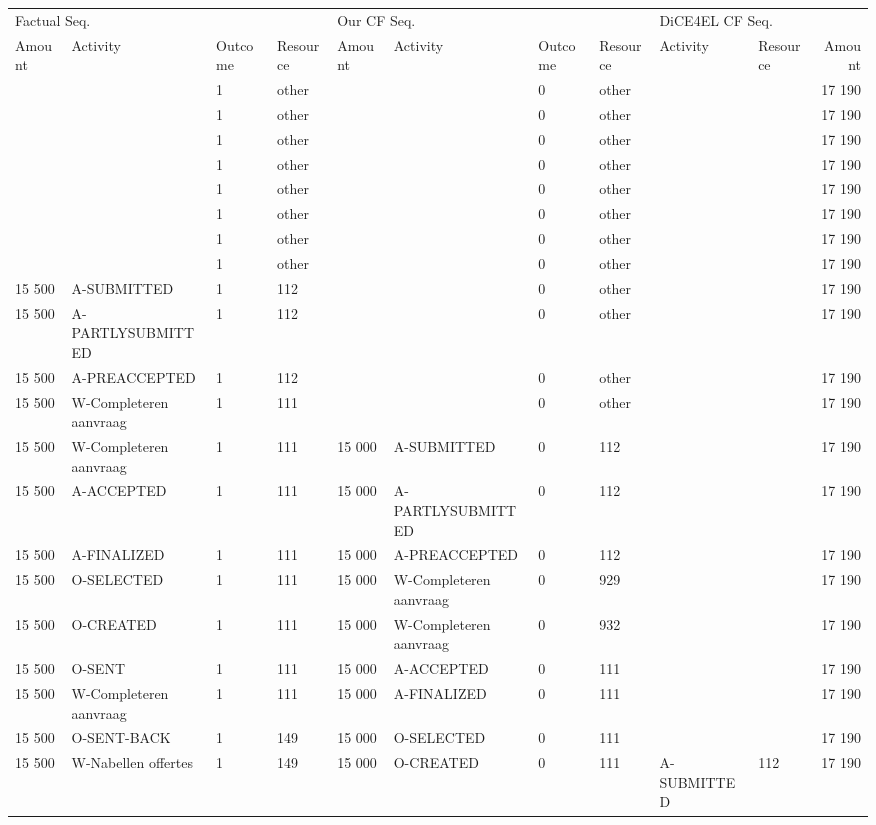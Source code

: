 \begin{tabular}{llllllllllr}
\toprule
\multicolumn{4}{l}{Factual Seq.} & \multicolumn{4}{l}{Our CF Seq.} & \multicolumn{3}{l}{DiCE4EL CF Seq.} \\
Amount & Activity & Outcome & Resource & Amount & Activity & Outcome & Resource & Activity & Resource & Amount \\
\midrule
 &  & 1 & other &  &  & 0 & other &  &  & 17 190 \\
 &  & 1 & other &  &  & 0 & other &  &  & 17 190 \\
 &  & 1 & other &  &  & 0 & other &  &  & 17 190 \\
 &  & 1 & other &  &  & 0 & other &  &  & 17 190 \\
 &  & 1 & other &  &  & 0 & other &  &  & 17 190 \\
 &  & 1 & other &  &  & 0 & other &  &  & 17 190 \\
 &  & 1 & other &  &  & 0 & other &  &  & 17 190 \\
 &  & 1 & other &  &  & 0 & other &  &  & 17 190 \\
15 500 & A-SUBMITTED & 1 & 112 &  &  & 0 & other &  &  & 17 190 \\
15 500 & A-PARTLYSUBMITTED & 1 & 112 &  &  & 0 & other &  &  & 17 190 \\
15 500 & A-PREACCEPTED & 1 & 112 &  &  & 0 & other &  &  & 17 190 \\
15 500 & W-Completeren aanvraag & 1 & 111 &  &  & 0 & other &  &  & 17 190 \\
15 500 & W-Completeren aanvraag & 1 & 111 & 15 000 & A-SUBMITTED & 0 & 112 &  &  & 17 190 \\
15 500 & A-ACCEPTED & 1 & 111 & 15 000 & A-PARTLYSUBMITTED & 0 & 112 &  &  & 17 190 \\
15 500 & A-FINALIZED & 1 & 111 & 15 000 & A-PREACCEPTED & 0 & 112 &  &  & 17 190 \\
15 500 & O-SELECTED & 1 & 111 & 15 000 & W-Completeren aanvraag & 0 & 929 &  &  & 17 190 \\
15 500 & O-CREATED & 1 & 111 & 15 000 & W-Completeren aanvraag & 0 & 932 &  &  & 17 190 \\
15 500 & O-SENT & 1 & 111 & 15 000 & A-ACCEPTED & 0 & 111 &  &  & 17 190 \\
15 500 & W-Completeren aanvraag & 1 & 111 & 15 000 & A-FINALIZED & 0 & 111 &  &  & 17 190 \\
15 500 & O-SENT-BACK & 1 & 149 & 15 000 & O-SELECTED & 0 & 111 &  &  & 17 190 \\
15 500 & W-Nabellen offertes & 1 & 149 & 15 000 & O-CREATED & 0 & 111 & A-SUBMITTED & 112 & 17 190 \\

\end{tabular}
